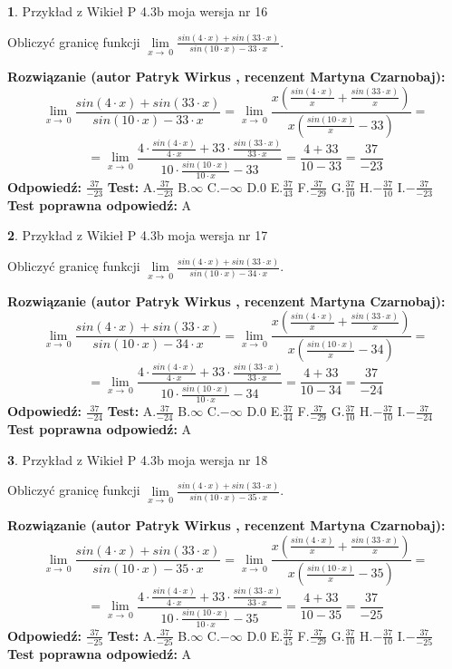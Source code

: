 \documentclass[12pt, a4paper]{article}
\theoremstyle{definition} %
\newtheorem{zad}{}
\newcommand{\zadStart}[1]{\begin{zad}#1\newline}
\newcommand{\zadStop}{\end{zad}}
\newcommand{\rozwStart}[2]{\noindent \textbf{Rozwiązanie (autor #1 , recenzent #2): }\newline}
\newcommand{\rozwStop}{\newline}
\newcommand{\odpStart}{\noindent \textbf{Odpowiedź:}\newline}
\newcommand{\odpStop}{\newline}
\newcommand{\testStart}{\noindent \textbf{Test:}\newline}
\newcommand{\testStop}{\newline}
\newcommand{\kluczStart}{\noindent \textbf{Test poprawna odpowiedź:}\newline}
\newcommand{\kluczStop}{\newline}
\begin{document}
\zadStart{Przykład z Wikieł P 4.3b moja wersja nr 16}


Obliczyć granicę funkcji $\lim\limits_{x\to\ 0}\frac{sin(4 \cdot x)+sin(33 \cdot x)}{sin(10 \cdot x)-33 \cdot x}$.
\zadStop
\rozwStart{Patryk Wirkus}{Martyna Czarnobaj}
$$\lim\limits_{x\to\ 0}\frac{sin(4 \cdot x)+sin(33 \cdot x)}{sin(10 \cdot x)-33 \cdot x}=\lim\limits_{x\to\ 0}\frac{x(\frac{sin(4 \cdot x)}{x}+\frac{sin(33 \cdot x)}{x})}{x(\frac{sin(10 \cdot x)}{x}-33)}=$$
$$=\lim\limits_{x\to\ 0}\frac{4 \cdot \frac{sin(4 \cdot x)}{4 \cdot x}+33 \cdot \frac{sin(33 \cdot x)}{33 \cdot x}}{10 \cdot \frac{sin(10 \cdot x)}{10 \cdot x}-33}=\frac{4+33}{10-33} = \frac{37}{-23}$$
\rozwStop
\odpStart
$\frac{37}{-23}$
\odpStop
\testStart
A.$\frac{37}{-23}$
B.$\infty$
C.$-\infty$
D.$0$
E.$\frac{37}{43}$
F.$\frac{37}{-29}$
G.$\frac{37}{10}$
H.$-\frac{37}{10}$
I.$-\frac{37}{-23}$
\testStop
\kluczStart
A
\kluczStop



\zadStart{Przykład z Wikieł P 4.3b moja wersja nr 17}


Obliczyć granicę funkcji $\lim\limits_{x\to\ 0}\frac{sin(4 \cdot x)+sin(33 \cdot x)}{sin(10 \cdot x)-34 \cdot x}$.
\zadStop
\rozwStart{Patryk Wirkus}{Martyna Czarnobaj}
$$\lim\limits_{x\to\ 0}\frac{sin(4 \cdot x)+sin(33 \cdot x)}{sin(10 \cdot x)-34 \cdot x}=\lim\limits_{x\to\ 0}\frac{x(\frac{sin(4 \cdot x)}{x}+\frac{sin(33 \cdot x)}{x})}{x(\frac{sin(10 \cdot x)}{x}-34)}=$$
$$=\lim\limits_{x\to\ 0}\frac{4 \cdot \frac{sin(4 \cdot x)}{4 \cdot x}+33 \cdot \frac{sin(33 \cdot x)}{33 \cdot x}}{10 \cdot \frac{sin(10 \cdot x)}{10 \cdot x}-34}=\frac{4+33}{10-34} = \frac{37}{-24}$$
\rozwStop
\odpStart
$\frac{37}{-24}$
\odpStop
\testStart
A.$\frac{37}{-24}$
B.$\infty$
C.$-\infty$
D.$0$
E.$\frac{37}{44}$
F.$\frac{37}{-29}$
G.$\frac{37}{10}$
H.$-\frac{37}{10}$
I.$-\frac{37}{-24}$
\testStop
\kluczStart
A
\kluczStop



\zadStart{Przykład z Wikieł P 4.3b moja wersja nr 18}


Obliczyć granicę funkcji $\lim\limits_{x\to\ 0}\frac{sin(4 \cdot x)+sin(33 \cdot x)}{sin(10 \cdot x)-35 \cdot x}$.
\zadStop
\rozwStart{Patryk Wirkus}{Martyna Czarnobaj}
$$\lim\limits_{x\to\ 0}\frac{sin(4 \cdot x)+sin(33 \cdot x)}{sin(10 \cdot x)-35 \cdot x}=\lim\limits_{x\to\ 0}\frac{x(\frac{sin(4 \cdot x)}{x}+\frac{sin(33 \cdot x)}{x})}{x(\frac{sin(10 \cdot x)}{x}-35)}=$$
$$=\lim\limits_{x\to\ 0}\frac{4 \cdot \frac{sin(4 \cdot x)}{4 \cdot x}+33 \cdot \frac{sin(33 \cdot x)}{33 \cdot x}}{10 \cdot \frac{sin(10 \cdot x)}{10 \cdot x}-35}=\frac{4+33}{10-35} = \frac{37}{-25}$$
\rozwStop
\odpStart
$\frac{37}{-25}$
\odpStop
\testStart
A.$\frac{37}{-25}$
B.$\infty$
C.$-\infty$
D.$0$
E.$\frac{37}{45}$
F.$\frac{37}{-29}$
G.$\frac{37}{10}$
H.$-\frac{37}{10}$
I.$-\frac{37}{-25}$
\testStop
\kluczStart
A
\kluczStop
\end{document}
